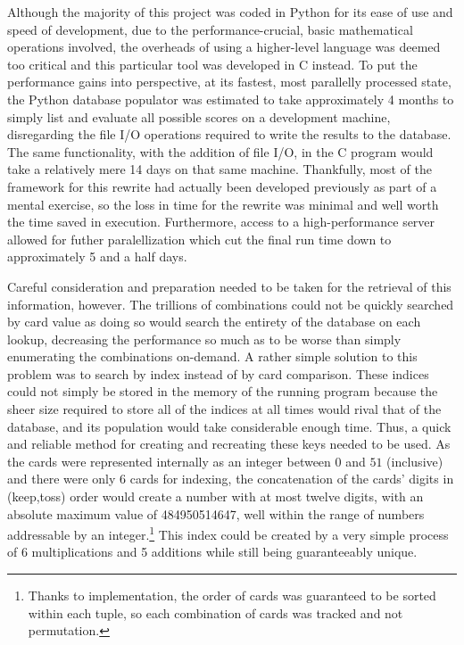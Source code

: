 Although the majority of this project was coded in Python for its ease of use
and speed of development,
due to the performance-crucial, basic mathematical operations involved,
the overheads of using a higher-level language was deemed too critical and
this particular tool was developed in C instead.
%
To put the performance gains into perspective,
at its fastest, most parallelly processed state,
the Python database populator was estimated to take approximately 4 months to
simply list and evaluate all possible scores on a development machine,
disregarding the file I/O operations required to write the results to the
database.
%
The same functionality, with the addition of file I/O,
in the C program would take a relatively mere 14 days
on that same machine.
%
Thankfully, most of the framework for this rewrite had actually been developed
previously as part of a mental exercise, so the loss in time for the rewrite was
minimal and well worth the time saved in execution.
%
Furthermore, access to a high-performance server allowed for futher
paralellization which cut the final run time down to approximately 5 and a half
days.

Careful consideration and preparation needed to be taken
for the retrieval of this information, however.
%
The trillions of combinations could not be quickly searched by card value as
doing so would search the entirety of the database on each lookup,
decreasing the performance so much as to be worse than simply
enumerating the combinations on-demand.
%
A rather simple solution to this problem was to search by index
instead of by card comparison.
%
These indices could not simply be stored in the memory of the running program
because the sheer size required to store all of the indices at all times
would rival that of the database,
and its population would take considerable enough time.
%
Thus, a quick and reliable method for creating and recreating these keys
needed to be used.
%
As the cards were represented internally as an integer between $0$ and $51$
(inclusive)
and there were only 6 cards for indexing,
the concatenation of the cards' digits in (keep,toss) order
would create a number with at most twelve digits,
with an absolute maximum value of 484950514647,
well within the range of numbers addressable by an integer.\footnote{
	Thanks to implementation,
	the order of cards was guaranteed to be sorted within each tuple,
	so each combination of cards was tracked and not permutation.
}
%
This index could be created by a very simple process of 6 multiplications and
5 additions
while still being guaranteeably unique.


